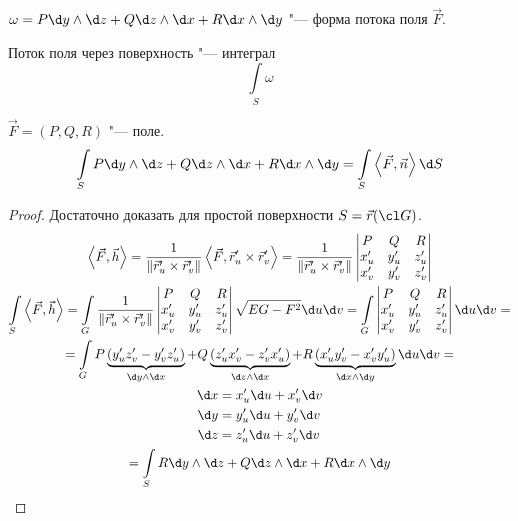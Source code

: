 \begin{Def}
	$\omega = P \d y \wedge \d z + Q \d z \wedge \d x + R \d x \wedge \d y$ "--- форма потока поля $\vec F$.
\end{Def}

\begin{Def}
	Поток поля через поверхность "--- интеграл
	\[ \int\limits_S \omega \]
\end{Def}

\begin{theorem}
	$\vec F = (P, Q, R)$ "--- поле.
	\[ \int\limits_S P \d y \wedge \d z + Q \d z \wedge \d x + R \d x \wedge \d y = \int\limits_S \left<\vec F, \vec n\right> \d S \]
\end{theorem}
\begin{proof}
	Достаточно доказать для простой поверхности $S = \vec r(\cl G)$.
	\begin{gather*}
		\left<\vec F, \vec h\right>
		= \frac1{\|\vec r_u' \times \vec r_v'\|} \left<\vec F, \vec r_u' \times \vec r_v'\right>
		= \frac1{\|\vec r_u' \times \vec r_v'\|} \begin{vmatrix} P & Q & R \\ x_u' & y_u' & z_u' \\ x_v' & y_v' & z_v' \end{vmatrix} \\
		\int\limits_S \left<\vec F, \vec h\right>
		= \int\limits_G \frac1{\|\vec r_u' \times \vec r_v'\|} \begin{vmatrix} P & Q & R \\ x_u' & y_u' & z_u' \\ x_v' & y_v' & z_v' \end{vmatrix} \sqrt{EG-F^2} \d u \d v
		= \int\limits_G \begin{vmatrix} P & Q & R \\ x_u' & y_u' & z_u' \\ x_v' & y_v' & z_v' \end{vmatrix} \d u \d v = \\
		= \int\limits_G P\underbrace{(y_u' z_v' - y_v' z_u')}_{\d y \wedge \d x} + Q\underbrace{(z_u' x_v' - z_v' x_u')}_{\d z \wedge \d x} + R\underbrace{(x_u' y_v' - x_v' y_u')}_{\d x \wedge \d y} \d u \d v = \\
		\begin{aligned}
			\d x &= x_u' \d u + x_v' \d v \\
			\d y &= y_u' \d u + y_v' \d v \\
			\d z &= z_u' \d u + z_v' \d v
		\end{aligned} \\
		= \int\limits_S R \d y \wedge \d z + Q \d z \wedge \d x + R \d x \wedge \d y
	\end{gather*}
\end{proof}
